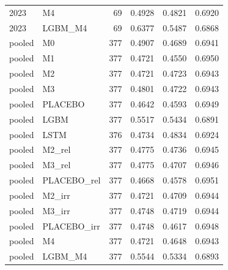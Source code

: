 \begin{tabular}{llrrrr}
2023 & M4 & 69 & 0.4928 & 0.4821 & 0.6920 \\
2023 & LGBM\_M4 & 69 & 0.6377 & 0.5487 & 0.6868 \\
pooled & M0 & 377 & 0.4907 & 0.4689 & 0.6941 \\
pooled & M1 & 377 & 0.4721 & 0.4550 & 0.6950 \\
pooled & M2 & 377 & 0.4721 & 0.4723 & 0.6943 \\
pooled & M3 & 377 & 0.4801 & 0.4722 & 0.6943 \\
pooled & PLACEBO & 377 & 0.4642 & 0.4593 & 0.6949 \\
pooled & LGBM & 377 & 0.5517 & 0.5434 & 0.6891 \\
pooled & LSTM & 376 & 0.4734 & 0.4834 & 0.6924 \\
pooled & M2\_rel & 377 & 0.4775 & 0.4736 & 0.6945 \\
pooled & M3\_rel & 377 & 0.4775 & 0.4707 & 0.6946 \\
pooled & PLACEBO\_rel & 377 & 0.4668 & 0.4578 & 0.6951 \\
pooled & M2\_irr & 377 & 0.4721 & 0.4709 & 0.6944 \\
pooled & M3\_irr & 377 & 0.4748 & 0.4719 & 0.6944 \\
pooled & PLACEBO\_irr & 377 & 0.4748 & 0.4617 & 0.6948 \\
pooled & M4 & 377 & 0.4721 & 0.4648 & 0.6943 \\
pooled & LGBM\_M4 & 377 & 0.5544 & 0.5334 & 0.6893 \\
\bottomrule
\end{tabular}
